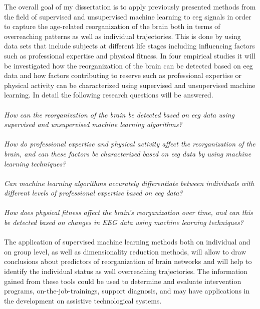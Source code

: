 The overall goal of my dissertation is to apply previously presented methods from the field of supervised and unsupervised machine learning to \gls{eeg} signals in order to capture the age-related reorganization of the brain both in terms of overreaching patterns as well as individual trajectories. This is done by using data sets that include subjects at different life stages including influencing factors such as professional expertise and physical fitness. In four empirical studies it will be investigated how the reorganization of the brain can be detected based on \gls{eeg} data and how factors contributing to reserve such as professional expertise or physical activity can be characterized using supervised and unsupervised machine learning. In detail the following research questions will be answered.\\
\\
\textit{How can the reorganization of the brain be detected based on \gls{eeg} data using supervised and unsupervised machine learning algorithms?}\\
\\
\textit{How do professional expertise and physical activity affect the reorganization of the brain, and can these factors be characterized based on \gls{eeg} data by using machine learning techniques?}\\
\\
\textit{Can machine learning algorithms accurately differentiate between individuals with different levels of professional expertise based on \gls{eeg} data?}\\
\\
\textit{How does physical fitness affect the brain's reorganization over time, and can this be detected based on changes in EEG data using machine learning techniques?}\\
\\
The application of supervised machine learning methods both on individual and on group level, as well as dimensionality reduction methods, will allow to draw conclusions about predictors of reorganization of brain networks and will help to identify the individual status as well overreaching trajectories. The information gained from these tools could be used to determine and evaluate intervention programs, on-the-job-trainings, support diagnosis, and may have applications in the development on assistive technological systems. 